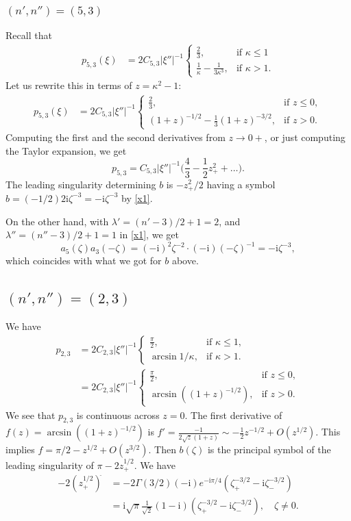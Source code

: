 \documentclass[11pt]{amsart}
\theoremstyle{definition}
\theoremstyle{remark}
\numberwithin{equation}{section}
\newcommand{\I}{\mathrm{i}}
\begin{document}
\subsubsection{$(n',n'')=(5,3)$}
Recall that 
\begin{align*}
	p_{5,3}(\xi) &=  2 C_{5,3} |\xi''|^{-1} \begin{cases}
		\frac{2}{3}, & \text{if $\kappa \leq 1$} \\
		\frac{1}{\kappa} - \frac{1}{3\kappa^3}, & \text{if $\kappa > 1$}.
	\end{cases}
\end{align*}
Let us rewrite this in terms of $z = \kappa^2 - 1$:
\begin{align*}
	p_{5,3}(\xi) &=  2 C_{5,3} |\xi''|^{-1} \begin{cases}
		\frac{2}{3}, & \text{if $z \leq 0$}, \\
		(1+z)^{-1/2} - \frac{1}{3} (1+z)^{-3/2}, & \text{if $z > 0$}.
	\end{cases}
\end{align*}
Computing the first and the second  derivatives from  $z \to 0+$, or just computing the Taylor expansion, we get
\[
	p_{5,3} =  C_{5,3} |\xi''|^{-1}\Big( \frac43 -\frac12 z_+^2 +\dots \Big).
\]
The leading singularity determining $b$ is $-z_+^2/2$ having a symbol $b= (-1/2) 2\I \zeta^{-3} = - \I \zeta^{-3}$ by \eqref{x1}. 

On the other hand, with $\lambda' = (n'-3)/2 + 1  = 2$, and $\lambda'' = (n''-3)/2+1 = 1$ in \eqref{x1}, we get 
\[
a_{5}(\zeta) a_3(-\zeta) = (-\I)^2 \zeta^{-2} \cdot (-\I) (-\zeta)^{-1} = -\I \zeta^{-3} , 
\]
which coincides with what we got for $b$ above. 


\subsection{$(n',n'')=(2,3)$} We have
\begin{align*}
	p_{2,3} &= 2 C_{2,3} |\xi''|^{-1} \begin{cases}
		\frac{\pi}{2}, & \text{if $\kappa \leq 1$},\\
		\arcsin{1/\kappa}, & \text{if $\kappa > 1$}.
	\end{cases}\\
	&=    2 C_{2,3} |\xi''|^{-1} \begin{cases}
		\frac{\pi}{2}, & \text{if $z \leq 0$},\\
		\arcsin{((1+z)^{-1/2})}, & \text{if $z > 0$}.
	\end{cases}
\end{align*} 
We see that $p_{2,3}$ is continuous across $z=0$.  
The first derivative of $f(z)= \arcsin{((1+z)^{-1/2})}$ is $f'=\frac{-1}{2 \sqrt{z} (1+z)}\sim -\frac12 z^{-1/2} +O(z^{1/2})$. This implies $f = \pi/2-z^{1/2}+O(z^{3/2})$. Then $b(\zeta)$ is the principal symbol of the leading singularity of $\pi-2 z_+^{1/2}$. We have 
\begin{align*}
	-2 (z_+^{1/2})^{\widehat{}} &= -2 \Gamma(3/2) (-\I) e^{-\I \pi/4} (\zeta_+^{-3/2} - \I \zeta_-^{-3/2}) \\
	&= \I \sqrt{\pi} \frac{1}{\sqrt{2}} (1-\I) (\zeta_+^{-3/2} - \I \zeta_{-}^{-3/2}), \quad \zeta\not=0.
\end{align*}
\end{document}

